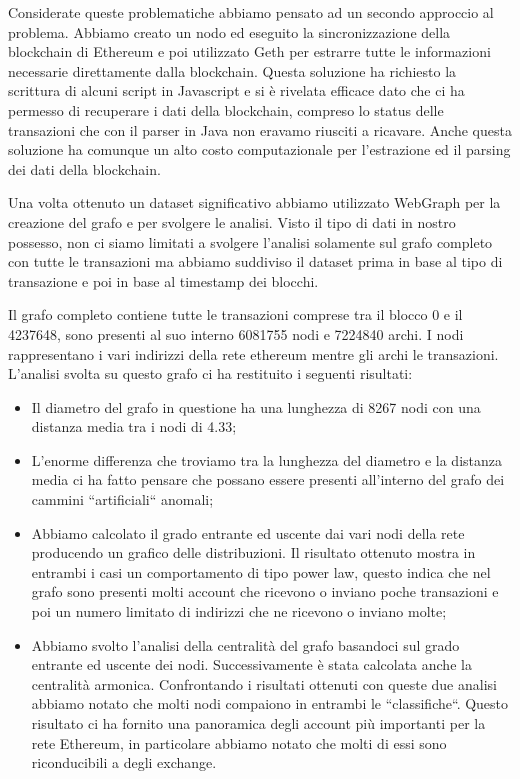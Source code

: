 \documentclass[12pt]{report}
\begin{document}
Considerate queste problematiche abbiamo pensato ad un secondo approccio al problema.
Abbiamo creato un nodo ed eseguito la sincronizzazione della blockchain di Ethereum e poi utilizzato Geth \cite{goEthereum} per estrarre tutte le informazioni necessarie direttamente dalla blockchain.
Questa soluzione ha richiesto la scrittura di alcuni script in Javascript e si è rivelata efficace dato che ci ha permesso di recuperare i dati della blockchain, compreso lo status delle transazioni che con il parser in Java non eravamo riusciti a ricavare.
\newline
Anche questa soluzione ha comunque un alto costo computazionale per l'estrazione ed il parsing dei dati della blockchain.

Una volta ottenuto un dataset significativo abbiamo utilizzato WebGraph \cite{WebGraph} per la creazione del grafo e per svolgere le analisi.
Visto il tipo di dati in nostro possesso, non ci siamo limitati a svolgere l'analisi solamente sul grafo completo con tutte le transazioni ma abbiamo suddiviso il dataset prima in base al tipo di transazione e poi in base al timestamp dei blocchi.

Il grafo completo contiene tutte le transazioni comprese tra il blocco 0 e il 4237648, sono presenti al suo interno 6081755 nodi e 7224840 archi.
I nodi rappresentano i vari indirizzi della rete ethereum mentre gli archi le transazioni.
L'analisi svolta su questo grafo ci ha restituito i seguenti risultati:
\begin{itemize}
    \item Il diametro del grafo in questione ha una lunghezza di 8267 nodi con una distanza media tra i nodi di 4.33;
    \item L'enorme differenza che troviamo tra la lunghezza del diametro e la distanza media ci ha fatto pensare che possano essere presenti all'interno del grafo dei cammini ``artificiali`` anomali;
    \item Abbiamo calcolato il grado entrante ed uscente dai vari nodi della rete producendo un grafico delle distribuzioni.
    Il risultato ottenuto mostra in entrambi i casi un comportamento di tipo power law, questo indica che nel grafo sono presenti molti account che ricevono o inviano poche transazioni e poi un numero limitato di indirizzi che ne ricevono o inviano molte;
    \item Abbiamo svolto l'analisi della centralità del grafo basandoci sul grado entrante ed uscente dei nodi. Successivamente è stata calcolata anche la centralità armonica.
    Confrontando i risultati ottenuti con queste due analisi abbiamo notato che molti nodi compaiono in entrambi le ``classifiche``. 
    Questo risultato ci ha fornito una panoramica degli account più importanti per la rete Ethereum, in particolare abbiamo notato che molti di essi sono riconducibili a degli exchange.
\end{itemize}
\end{document}

